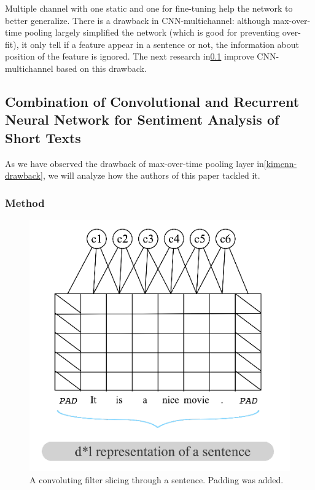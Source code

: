 Multiple channel with one static and one for fine-tuning help the network to better generalize.
There is a drawback in CNN-multichannel: although max-over-time pooling largely simplified the network (which is good for preventing over-fit), it only tell if a feature appear in a sentence or not, the information about position of the feature is ignored.\label{kim-drawback}
The next research in\ref{cnn-rnn}  improve CNN-multichannel based on this drawback.
 

\subsection{Combination of Convolutional and Recurrent Neural Network for Sentiment Analysis of Short Texts}\label{cnn-rnn}
As we have observed the drawback of max-over-time pooling layer in\ref{kimcnn-drawback}, we will analyze how the authors of this paper\cite{cnn-rnn} tackled it.

\subsubsection{Method}
\begin{figure}[H]
	\centering
\includegraphics[scale=0.45]{figure/conv-word}
	\caption{A convoluting filter slicing through a sentence. 
	Padding was added.}
	\label{fig:conv-word}
\end{figure}

